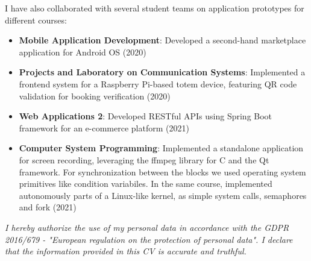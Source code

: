 \documentclass[a4paper]{article}
\begin{document}
\vspace{0.5ex}
I have also collaborated with several student teams on application prototypes for different courses:
\begin{itemize}[leftmargin=*]
\item \textbf{Mobile Application Development}: Developed a second-hand marketplace application for Android OS (2020)
\item \textbf{Projects and Laboratory on Communication Systems}: Implemented a frontend system for a Raspberry Pi-based totem device, featuring QR code validation for booking verification (2020)
\item \textbf{Web Applications 2}: Developed RESTful APIs using Spring Boot framework for an e-commerce platform (2021)
\item \textbf{Computer System Programming}: Implemented a standalone application for screen recording, leveraging the ffmpeg library for C and the Qt framework. For synchronization between the blocks we used operating system primitives like condition variabiles. In the same course, implemented autonomously parts of a Linux-like kernel, as simple system calls, semaphores and fork (2021) 
\end{itemize}

\vfill
\noindent\begin{minipage}{\textwidth}
\footnotesize \textit{I hereby authorize the use of my personal data in accordance with the GDPR 2016/679 - "European regulation on the protection of personal data". I declare that the information provided in this CV is accurate and truthful.}
\end{minipage}
\end{document}
